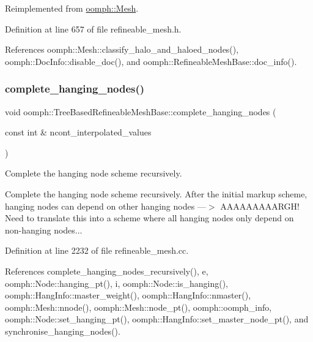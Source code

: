 Reimplemented from \hyperlink{classoomph_1_1Mesh_af2a6ebabea8704acadffb735a2c868bb}{oomph\+::\+Mesh}.



Definition at line 657 of file refineable\+\_\+mesh.\+h.



References oomph\+::\+Mesh\+::classify\+\_\+halo\+\_\+and\+\_\+haloed\+\_\+nodes(), oomph\+::\+Doc\+Info\+::disable\+\_\+doc(), and oomph\+::\+Refineable\+Mesh\+Base\+::doc\+\_\+info().

\mbox{\label{classoomph_1_1TreeBasedRefineableMeshBase_aab6f14b0933edc819231a88b1d555f62}} 
\subsubsection{\texorpdfstring{complete\+\_\+hanging\+\_\+nodes()}{complete\_hanging\_nodes()}}
{\footnotesize\ttfamily void oomph\+::\+Tree\+Based\+Refineable\+Mesh\+Base\+::complete\+\_\+hanging\+\_\+nodes (\begin{DoxyParamCaption}\item[{const int \&}]{ncont\+\_\+interpolated\+\_\+values }\end{DoxyParamCaption})\hspace{0.3cm}{\ttfamily [protected]}}



Complete the hanging node scheme recursively. 

Complete the hanging node scheme recursively. After the initial markup scheme, hanging nodes can depend on other hanging nodes ---$>$ A\+A\+A\+A\+A\+A\+A\+A\+A\+R\+G\+H! Need to translate this into a scheme where all hanging nodes only depend on non-\/hanging nodes... 

Definition at line 2232 of file refineable\+\_\+mesh.\+cc.



References complete\+\_\+hanging\+\_\+nodes\+\_\+recursively(), e, oomph\+::\+Node\+::hanging\+\_\+pt(), i, oomph\+::\+Node\+::is\+\_\+hanging(), oomph\+::\+Hang\+Info\+::master\+\_\+weight(), oomph\+::\+Hang\+Info\+::nmaster(), oomph\+::\+Mesh\+::nnode(), oomph\+::\+Mesh\+::node\+\_\+pt(), oomph\+::oomph\+\_\+info, oomph\+::\+Node\+::set\+\_\+hanging\+\_\+pt(), oomph\+::\+Hang\+Info\+::set\+\_\+master\+\_\+node\+\_\+pt(), and synchronise\+\_\+hanging\+\_\+nodes().



